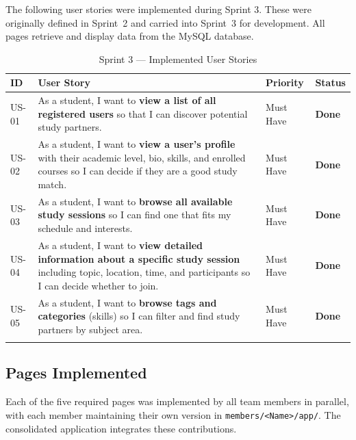 \documentclass[11pt,a4paper]{article}
\begin{document}
The following user stories were implemented during Sprint 3. These were originally defined in Sprint~2 and carried into Sprint~3 for development. All pages retrieve and display data from the MySQL database.

\begin{longtable}{p{1.2cm}p{9.5cm}p{2cm}p{2cm}}
    \toprule
    \textbf{ID} & \textbf{User Story} & \textbf{Priority} & \textbf{Status} \\
    \midrule
    \endhead

    US-01 & As a student, I want to \textbf{view a list of all registered users} so that I can discover potential study partners. & Must Have & \textbf{Done} \\[4pt]

    US-02 & As a student, I want to \textbf{view a user's profile} with their academic level, bio, skills, and enrolled courses so I can decide if they are a good study match. & Must Have & \textbf{Done} \\[4pt]

    US-03 & As a student, I want to \textbf{browse all available study sessions} so I can find one that fits my schedule and interests. & Must Have & \textbf{Done} \\[4pt]

    US-04 & As a student, I want to \textbf{view detailed information about a specific study session} including topic, location, time, and participants so I can decide whether to join. & Must Have & \textbf{Done} \\[4pt]

    US-05 & As a student, I want to \textbf{browse tags and categories} (skills) so I can filter and find study partners by subject area. & Must Have & \textbf{Done} \\[4pt]

    \bottomrule
    \caption{Sprint 3 — Implemented User Stories}
\end{longtable}

\subsection{Pages Implemented}

Each of the five required pages was implemented by all team members in parallel, with each member maintaining their own version in \texttt{members/<Name>/app/}. The consolidated application integrates these contributions.
\end{document}
